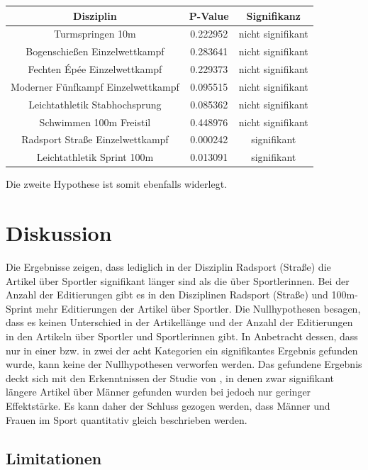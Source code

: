\documentclass[11pt]{article}
\begin{document}
\begin{tabular}{ c|c|c }
  Disziplin & P-Value & Signifikanz \\
  \hline
  Turmspringen 10m & 0.222952 & nicht signifikant \\
  Bogenschießen Einzelwettkampf & 0.283641 & nicht signifikant \\
  Fechten Épée Einzelwettkampf & 0.229373 & nicht signifikant \\
  Moderner Fünfkampf Einzelwettkampf & 0.095515 & nicht signifikant \\
  Leichtathletik Stabhochsprung & 0.085362 & nicht signifikant \\
  Schwimmen 100m Freistil & 0.448976 & nicht signifikant \\
  Radsport Straße Einzelwettkampf & 0.000242 & signifikant \\
  Leichtathletik Sprint 100m & 0.013091 & signifikant \\
\end{tabular}

Die zweite Hypothese ist somit ebenfalls widerlegt. 


\section {Diskussion}

Die Ergebnisse zeigen, dass lediglich in der Disziplin Radsport (Straße) die Artikel über Sportler signifikant länger sind als die über Sportlerinnen. Bei der Anzahl der Editierungen gibt es in den Disziplinen Radsport (Straße) und 100m-Sprint mehr Editierungen der Artikel über Sportler. Die Nullhypothesen besagen, dass es keinen Unterschied in der Artikellänge und der Anzahl der Editierungen in den Artikeln über Sportler und Sportlerinnen gibt. In Anbetracht dessen, dass nur in einer bzw. in zwei der acht Kategorien ein signifikantes Ergebnis gefunden wurde, kann keine der Nullhypothesen verworfen werden.
Das gefundene Ergebnis deckt sich mit den Erkenntnissen der Studie von \textcite{GraellsGarrido2015}, in denen zwar signifikant längere Artikel über Männer gefunden wurden bei jedoch nur geringer Effektstärke. Es kann daher der Schluss gezogen werden, dass Männer und Frauen im Sport quantitativ gleich beschrieben werden.

\subsection {Limitationen}
\end{document}
